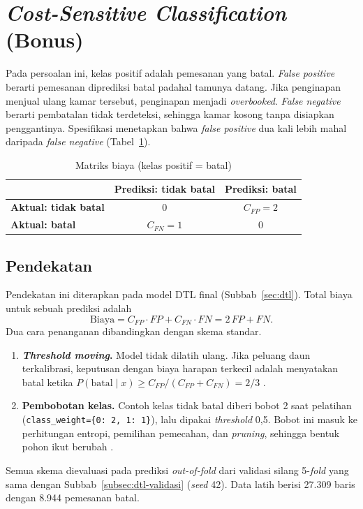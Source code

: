 \section{\textit{Cost-Sensitive Classification} (Bonus)}
\label{sec:cost-sensitive}

Pada persoalan ini, kelas positif adalah pemesanan yang batal. \textit{False positive} berarti
pemesanan diprediksi batal padahal tamunya datang. Jika penginapan menjual ulang kamar tersebut,
penginapan menjadi \textit{overbooked}. \textit{False negative} berarti pembatalan tidak terdeteksi,
sehingga kamar kosong tanpa disiapkan penggantinya. Spesifikasi menetapkan bahwa \textit{false
positive} dua kali lebih mahal daripada \textit{false negative} (Tabel~\ref{tab:cost-matrix}).

\begin{table}[H]
	\centering
	\caption{Matriks biaya (kelas positif = batal)}
	\label{tab:cost-matrix}
	\begin{tabular}{l c c}
		\toprule
		& \textbf{Prediksi: tidak batal} & \textbf{Prediksi: batal} \\
		\midrule
		\textbf{Aktual: tidak batal} & 0 & $C_{FP} = 2$ \\
		\textbf{Aktual: batal} & $C_{FN} = 1$ & 0 \\
		\bottomrule
	\end{tabular}
\end{table}

\subsection{Pendekatan}

Pendekatan ini diterapkan pada model DTL final (Subbab~\ref{sec:dtl}). Total biaya untuk sebuah
prediksi adalah
\begin{equation}
	\text{Biaya} = C_{FP} \cdot FP + C_{FN} \cdot FN = 2\,FP + FN.
\end{equation}
Dua cara penanganan dibandingkan dengan skema standar.
\begin{enumerate}
	\item \textbf{\textit{Threshold moving}.} Model tidak dilatih ulang. Jika peluang daun
	terkalibrasi, keputusan dengan biaya harapan terkecil adalah menyatakan batal ketika
	$P(\text{batal} \mid x) \ge C_{FP} / (C_{FP} + C_{FN}) = 2/3$ \cite{elkan2001cost}.
	\item \textbf{Pembobotan kelas.} Contoh kelas tidak batal diberi bobot 2 saat pelatihan
	(\texttt{class\_weight=\{0: 2, 1: 1\}}), lalu dipakai \textit{threshold} 0,5. Bobot ini masuk ke
	perhitungan entropi, pemilihan pemecahan, dan \textit{pruning}, sehingga bentuk pohon ikut berubah
	\cite{ting2002instance}.
\end{enumerate}
Semua skema dievaluasi pada prediksi \textit{out-of-fold} dari validasi silang 5-\textit{fold} yang
sama dengan Subbab~\ref{subsec:dtl-validasi} (\textit{seed} 42). Data latih berisi 27.309 baris dengan
8.944 pemesanan batal.

